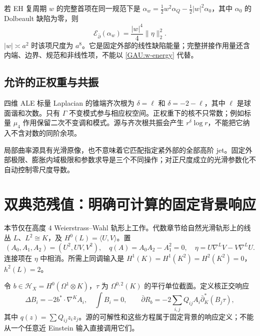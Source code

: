 \documentclass[UTF8,fontset=fandol,zihao=-4,oneside,openany]{ctexbook}
\theoremstyle{cjkplain}
\numberwithin{equation}{chapter}
\begin{document}
若 EH 复周期 $w$ 的完整首项在同一规范下是
$\alpha_w=\frac12w^2\alpha_Q-\frac12|w|^2\alpha_0$，其中 $\alpha_0$ 的 Dolbeault 缺陷为零，则
\begin{equation}\label{GAU:w-energy}
\mathcal E_{\bar\partial}(\alpha_w)=\frac{|w|^4}{4}\|\eta\|_2^2.
\end{equation}
$|w|\asymp a^2$ 时该项尺度为 $a^8$。它是固定外部的线性缺陷能量；完整拼接作用量还含内端、边界、规范和非线性项，不能以 \eqref{GAU:w-energy} 代替。

\subsection{允许的正权重与共振}
四维 ALE 标量 Laplacian 的锥端齐次根为
$\delta=\ell$ 和 $\delta=-2-\ell$，其中 $\ell$ 是球面谐和次数。只有 $\Gamma$ 不变模式参与相应权空间。正权重下的核不只常数；例如标量 $\mu_4$ 作用保留二次不变调和模式。源与齐次根共振会产生 $r^\delta\log r$，不能把它纳入不含对数的同阶余项。

局部曲率源具有光滑原像，也不意味着它匹配指定紧外部的全部高阶 jet。固定外部极限、膨胀内域极限和参数求导是三个不同操作；对正尺度成立的光滑参数化不自动控制零尺度导数。

\section{双典范残值：明确可计算的固定背景响应}
\label{GAU:residue}

本节仅在高度 $4$ Weierstrass--Wahl 轨形上工作。代数章节给自然光滑轨形上的线丛 $L$、$L^2\cong K$，及 $H^0(L)=\langle U,V\rangle$。置
\[
(A_0,A_1,A_2)=(U^2,UV,V^2),\quad q(A)=A_0A_2-A_1^2=0,
\quad\eta=U\nabla^LV-V\nabla^LU.
\]
连接项在 $\eta$ 中相消。所需上同调输入是
$H^1(K)=H^1(K^2)=H^2(K^2)=0$，$h^2(L)=2$。

令 $b\in\mathcal H_X=H^0(\Omega^1\otimes K)$，$\tau$ 为 $\Omega^{0,2}(K)$ 的平行单位截面。定义核正交响应
\begin{equation}\label{GAU:response-system}
\Delta B_i=-2b^*\!\cdot\nabla^KA_i,\quad\int B_i=0,
\qquad
\bar\partial R_b=-2\sum_{i,j}Q_{ij}A_i\bar\partial_K^*(B_j\tau),
\end{equation}
其中 $q(z)=\sum Q_{ij}z_iz_j$。源的可解性和这些方程属于固定背景的响应定义；不能从一个任意近 Einstein 输入直接调用它们。
\end{document}
